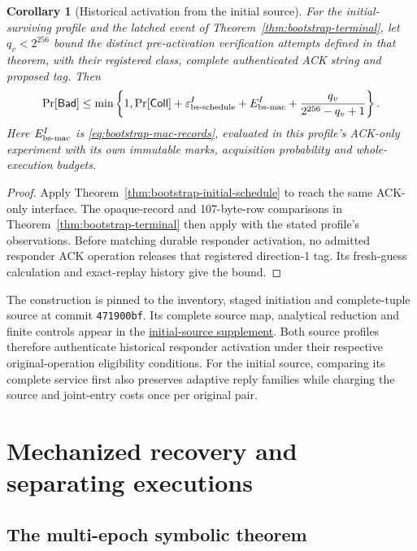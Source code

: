 \documentclass[pdflatex]{sn-jnl}
\theoremstyle{thmstyleone}
\newtheorem{corollary}[theorem]{Corollary}
\theoremstyle{thmstylethree}
\theoremstyle{thmstyletwo}
\begin{document}
\begin{corollary}[Historical activation from the initial source]
\label{cor:bootstrap-initial-terminal}
For the initial-surviving profile and the latched event of
Theorem~\ref{thm:bootstrap-terminal}, let $q_v<2^{256}$ bound the distinct
pre-activation verification attempts defined in that theorem, with their
registered class, complete authenticated ACK string and proposed tag. Then
\[
 \Pr[\mathsf{Bad}]\le\min\left\{1,
  \Pr[\mathsf{Coll}]+\varepsilon^I_{\rm bs\text{-}schedule}
   +E^I_{\rm bs\text{-}mac}
   +\frac{q_v}{2^{256}-q_v+1}\right\}.
\]
Here $E^I_{\rm bs\text{-}mac}$ is
\eqref{eq:bootstrap-mac-records}, evaluated in this profile's ACK-only
experiment with its own immutable marks, acquisition probability and
whole-execution budgets.
\end{corollary}
\begin{proof}
Apply Theorem~\ref{thm:bootstrap-initial-schedule} to reach the same
ACK-only interface. The opaque-record and 107-byte-row comparisons in
Theorem~\ref{thm:bootstrap-terminal} then apply with the stated
profile's observations. Before matching durable responder activation,
no admitted responder ACK operation releases that registered direction-1
tag. Its fresh-guess calculation and exact-replay history give the bound.
\end{proof}

The construction is pinned to the inventory, staged initiation and
complete-tuple source at commit \texttt{471900bf}. Its complete source
map, analytical reduction and finite controls appear in the
\href{https://github.com/billlza/q-periapt/blob/81483b52a24a4cc81c2276c5a0d0b667c42761cd/docs/continuity/BOOTSTRAP_INITIAL_SOURCE_ADAPTER_V1.md}{initial-source supplement}.
Both source profiles therefore authenticate historical responder
activation under their respective original-operation eligibility
conditions. For the initial source, comparing its complete service first
also preserves adaptive reply families while charging the source and
joint-entry costs once per original pair.
\section{Mechanized recovery and separating executions}
\label{sec:established}

\subsection{The multi-epoch symbolic theorem}
\end{document}
